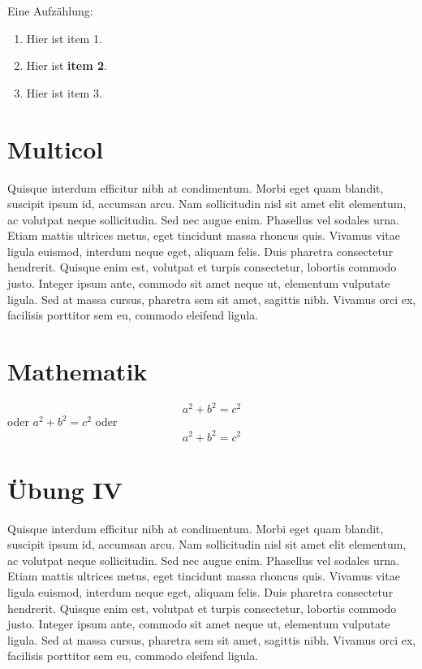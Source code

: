 \documentclass[a4paper, ngerman, oneside, 10pt]{article}
\begin{document}
Eine Aufzählung:
\begin{enumerate}
	\item Hier ist item 1.
	\item Hier ist \textbf{item 2}.
	\item Hier ist item 3.
\end{enumerate}

\newpage
\section{Multicol}
\begin{multicols}{2}
	Quisque interdum efficitur nibh at condimentum. Morbi eget quam blandit, suscipit ipsum id, accumsan arcu. Nam sollicitudin nisl sit amet elit elementum, ac volutpat neque sollicitudin. Sed nec augue enim. Phasellus vel sodales urna. Etiam mattis ultrices metus, eget tincidunt massa rhoncus quis. Vivamus vitae ligula euismod, interdum neque eget, aliquam felis. Duis pharetra consectetur hendrerit. Quisque enim est, volutpat et turpis consectetur, lobortis commodo justo. Integer ipsum ante, commodo sit amet neque ut, elementum vulputate ligula. Sed at massa cursus, pharetra sem sit amet, sagittis nibh. Vivamus orci ex, facilisis porttitor sem eu, commodo eleifend ligula.
\end{multicols}

\section{Mathematik}
\begin{equation}
	a^{2}+b^{2}=c^{2}
	\label{gleichung:Pytagoras}
\end{equation}
oder
$a^{2}+b^{2}=c^{2}$ oder
$$a^{2}+b^{2}=c^{2}$$

\section{Übung IV}
\begin{multicols}{3}
	Quisque interdum efficitur nibh at condimentum. Morbi eget quam blandit, suscipit ipsum id, accumsan arcu. Nam sollicitudin nisl sit amet elit elementum, ac volutpat neque sollicitudin. Sed nec augue enim. Phasellus vel sodales urna. Etiam mattis ultrices metus, eget tincidunt massa rhoncus quis. Vivamus vitae ligula euismod, interdum neque eget, aliquam felis. Duis pharetra consectetur hendrerit. Quisque enim est, volutpat et turpis consectetur, lobortis commodo justo. Integer ipsum ante, commodo sit amet neque ut, elementum vulputate ligula. Sed at massa cursus, pharetra sem sit amet, sagittis nibh. Vivamus orci ex, facilisis porttitor sem eu, commodo eleifend ligula.
\end{multicols}
\end{document}
